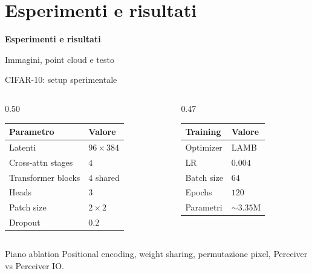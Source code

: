 \documentclass[aspectratio=169,10pt]{beamer}
\begin{document}
\section{Esperimenti e risultati}

\begin{frame}[plain]
\centering
\vfill
{\Huge\color{DeepBlue}\textbf{Esperimenti e risultati}}
\vspace{1em}

{\large Immagini, point cloud e testo}
\vfill
\end{frame}

\begin{frame}{CIFAR-10: setup sperimentale}
\small
\begin{columns}[T]
\begin{column}{0.50\textwidth}
\begin{tabular}{ll}
\toprule
\textbf{Parametro} & \textbf{Valore} \\
\midrule
Latenti & $96 \times 384$ \\
Cross-attn stages & $4$ \\
Transformer blocks & $4$ shared \\
Heads & $3$ \\
Patch size & $2 \times 2$ \\
Dropout & $0.2$ \\
\bottomrule
\end{tabular}
\end{column}
\begin{column}{0.47\textwidth}
\begin{tabular}{ll}
\toprule
\textbf{Training} & \textbf{Valore} \\
\midrule
Optimizer & LAMB \\
LR & $0.004$ \\
Batch size & $64$ \\
Epochs & $120$ \\
Parametri & $\sim3.35$M \\
\bottomrule
\end{tabular}
\end{column}
\end{columns}

\begin{block}{Piano ablation}
Positional encoding, weight sharing, permutazione pixel, Perceiver vs Perceiver IO.
\end{block}
\end{frame}
\end{document}
